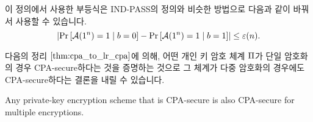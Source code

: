 이 정의에서 사용한 부등식은 IND-PASS의 정의와 비슷한 방법으로 다음과 같이 바꿔서 사용할 수 있습니다.
\begin{equation}
  \left| 
    \text{Pr} \left[ \mathcal{A}(1^n) = 1 \;|\; b = 0 \right] - \text{Pr} \left[ \mathcal{A}(1^n) = 1 \;|\; b = 1 \right]
   \right| \le \varepsilon(n).
\end{equation}

다음의 정리 $\ref{thm:cpa_to_lr_cpa}$에 의해, 어떤 개인 키 암호 체계 $\Pi$가 단일 암호화의 경우 CPA-secure하다는 것을 증명하는 것으로 그 체계가 다중 암호화의 경우에도 CPA-secure하다는 결론을 내릴 수 있습니다.

\begin{theorem} \label{thm:cpa_to_lr_cpa}
  Any private-key encryption scheme that is CPA-secure is also CPA-secure for multiple encryptions.
\end{theorem}

